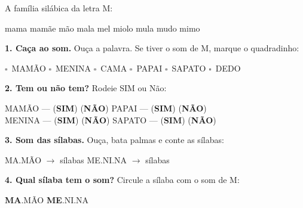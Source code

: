
\begin{familiasilabica}
A fam\'ilia sil\'abica da letra M:

\begin{center}
mama \quad mam\~a{}e \quad m\~a{}o \quad mala \quad mel \quad miolo \quad mula \quad mudo \quad mimo
\end{center}
\end{familiasilabica}


\begin{somletra}
\textbf{1. Ca\c{c}a ao som.} Ou\c{c}a a palavra. Se tiver o som de M, marque o quadradinho:
\begin{center}
$\square$~MAM\~AO \quad $\square$~MENINA \quad $\square$~CAMA \quad $\square$~PAPAI \quad $\square$~SAPATO \quad $\square$~DEDO
\end{center}

\textbf{2. Tem ou n\~ao{} tem?} Rodeie SIM ou N\~ao:
\begin{center}
MAM\~AO --- (\textbf{SIM}) (\textbf{N\~AO}) \quad PAPAI --- (\textbf{SIM}) (\textbf{N\~AO}) \\ MENINA --- (\textbf{SIM}) (\textbf{N\~AO}) \quad SAPATO --- (\textbf{SIM}) (\textbf{N\~AO})
\end{center}
\end{somletra}

\begin{somsilaba}
\textbf{3. Som das s\'ilabas.} Ou\c{c}a, bata palmas e conte as s\'ilabas:
\begin{center}
MA.M\~AO $\rightarrow$ \underline{\hspace{1cm}} s\'ilabas \quad ME.NI.NA $\rightarrow$ \underline{\hspace{1cm}} s\'ilabas
\end{center}

\textbf{4. Qual s\'ilaba tem o som?} Circule a s\'ilaba com o som de M:
\begin{center}
\textbf{MA}.M\~AO \quad \textbf{ME}.NI.NA
\end{center}
\end{somsilaba}




